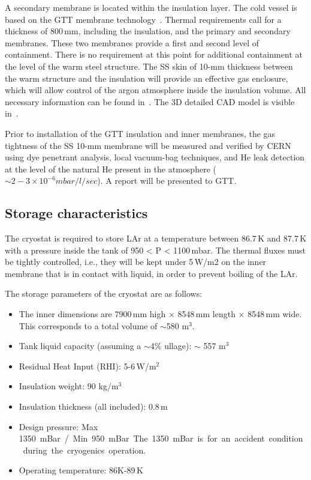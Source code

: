 A secondary membrane is located within the insulation layer. The cold vessel is based on the GTT membrane technology~\cite{gtt}.   Thermal requirements call for 
a thickness of 800\,mm, including the insulation, and the primary and secondary membranes. These two membranes provide a first and second level of containment. There is no requirement at this point for additional containment at the level of the warm steel structure. The SS skin of 10-mm thickness between the warm structure and the insulation will provide an effective gas enclosure, which will allow control of the argon atmosphere inside the insulation volume.
All necessary information can be found in~\cite{edms1}. 
The 3D detailed CAD model is visible in~\cite{edms2}. 

Prior to installation of the GTT insulation and %
inner membranes, the gas tightness of the SS 10-mm membrane will be measured and verified by CERN using dye penetrant analysis, local vacuum-bag techniques, and He leak %
detection at the level of the natural He present in the atmosphere ($\sim2-3 \times 10^{-6} mbar/l/sec$). A report will be presented to GTT.

\subsection{Storage characteristics}


The 
cryostat is required to store LAr at a temperature between 86.7\,K and 87.7\,K with a pressure inside the 
tank of 950 < P < 1100\,mbar. %
The thermal fluxes must be tightly controlled, i.e., %
they will be kept under 5\,W/m2 on %
the inner membrane that is in contact with liquid, in order to prevent boiling of the LAr.

The storage parameters of the cryostat are as follows:
\begin{itemize} %
\item The inner dimensions are 7900\,mm high $\times$ 8548\,mm length $\times$ 8548\,mm wide.  This corresponds to a total volume of $\sim$580 m$^3$. 
\item Tank liquid capacity (assuming a $\sim$4\% ullage): $\sim$ 557 m$^3$
\item Residual Heat Input (RHI): 5-6\,W/m$^2$
\item Insulation weight: 90 kg/m$^3$  
\item Insulation thickness (all included): 0.8\,m 
\item Design pressure: Max \SI{1350} mBar / Min 950 mBar.  The \SI{1350} mBar is for an accident condition during the cryogenics operation.
\item Operating temperature: 86K-89\,K
\end{itemize}

